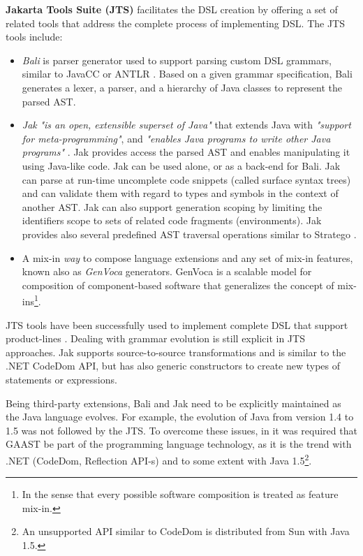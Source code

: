 \noindent \textbf{Jakarta Tools Suite (JTS)} \cite{batory98jts} facilitates the DSL creation by offering a set of related tools that address the complete process of implementing DSL. The JTS tools include:
\begin{itemize}

\item \textit{Bali} is parser generator used to support parsing custom DSL grammars, similar to JavaCC \cite{javacc} or ANTLR \cite{antlr}.  Based on a given grammar specification, Bali generates a lexer, a parser, and a hierarchy of Java classes to represent the parsed AST.

\item  \textit{Jak} \textit{"is an open, extensible superset of Java"} that extends Java with \textit{"support for meta-programming"}, and \textit{"enables Java programs to write other Java programs"} \cite{batory98jts}. Jak provides access the parsed AST and enables manipulating it using Java-like code. Jak can be used alone, or as a back-end for Bali. Jak can parse at run-time uncomplete code snippets (called surface syntax trees) and can validate them with regard to types and symbols in the context of another AST. Jak can also support generation scoping by limiting the identifiers scope to sets of related code fragments (environments). Jak provides also several predefined AST traversal operations similar to Stratego \cite{stratego.01}.

\item A  mix-in \cite{bracha90mixinbased} \textit{way} to compose language extensions and any set of mix-in features, known also as \textit{GenVoca} \cite{genvoca.94} generators. GenVoca is a scalable model for composition of component-based software that generalizes the concept of mix-ins\footnote{In the sense that every possible software composition is treated as feature mix-in.}.
\end{itemize}

JTS tools have been successfully used to implement complete DSL that support product-lines \cite{dsl-pl.2000}. Dealing with grammar evolution is still explicit in JTS approaches. Jak supports source-to-source transformations and is similar to the .NET CodeDom API, but has also generic constructors to create new types of statements or expressions. 

Being third-party extensions, Bali and Jak need to be explicitly maintained as the Java language evolves. For example, the evolution of Java from version 1.4 to 1.5 was not followed by the JTS. To overcome these issues, in  it was required that GAAST be part of the programming language technology, as it is the trend with .NET (CodeDom, Reflection API-s) and to some extent with Java 1.5\footnote{An unsupported API similar to CodeDom is distributed from Sun with Java 1.5.}.

